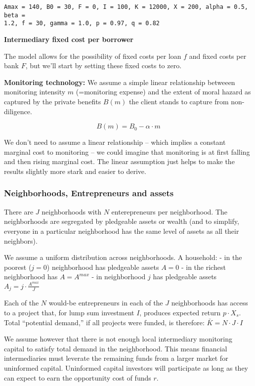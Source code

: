 \documentclass[11pt]{article}
\begin{document}
    \begin{Verbatim}[commandchars=\\\{\}]
Amax = 140, B0 = 30, F = 0, I = 100, K = 12000, X = 200, alpha = 0.5, beta =
1.2, f = 30, gamma = 1.0, p = 0.97, q = 0.82
    \end{Verbatim}

    \textbf{Intermediary fixed cost per borrower}

The model allows for the possibility of fixed costs per loan \(f\) and
fixed costs per bank \(F\), but we'll start by setting these fixed costs
to zero.

    \textbf{Monitoring technology:} We assume a simple linear relationship
betweeen monitoring intensity \(m\) (=monitoring expense) and the extent
of moral hazard as captured by the private benefits \(B(m)\) the client
stands to capture from non-diligence.

    \[B(m) = B_0 - \alpha \cdot m\]

    We don't need to assume a linear relationship -- which implies a
constant marginal cost to monitoring -- we could imagine that monitoring
is at first falling and then rising marginal cost. The linear assumption
just helps to make the results slightly more stark and easier to derive.

    \subsubsection{Neighborhoods, Entrepreneurs and
assets}\label{neighborhoods-entrepreneurs-and-assets}

There are \(J\) neighborhoods with \(N\) enterepreneurs per
neighborhood. The neighborhoods are segregated by pledgeable assets or
wealth (and to simplify, everyone in a particular neighborhood has the
same level of assets as all their neighbors).

We assume a uniform distribution across neighborhoods. A household: - in
the poorest (\(j=0\)) neighborhood has pledgeable assets \(A=0\) - in
the richest neighborhood has \(A=A^{max}\) - in neighborhood \(j\) has
pledgeable assets \(A_j = j \cdot \frac{A^{max}}{J}\)

    Each of the \(N\) would-be entrepreneurs in each of the \(J\)
neighborhoods has access to a project that, for lump sum investment
\(I\), produces expected return \(p\cdot X_s\). Total ``potential
demand,'' if all projects were funded, is therefore:
\(\bar{K} = N \cdot J \cdot I\)

We assume however that there is not enough local intermediary monitoring
capital to satisfy total demand in the neighborhood. This means
financial intermediaries must leverate the remaining funds from a larger
market for uninformed capital. Uninformed capital investors will
participate as long as they can expect to earn the opportunity cost of
funds \(r\).
\end{document}
